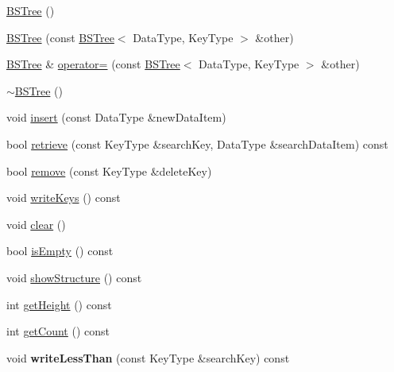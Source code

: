 \begin{DoxyCompactItemize}
\item 
\hyperlink{class_b_s_tree_a4513fc6697f5e51bff8e7c448b446c9e}{B\+S\+Tree} ()
\item 
\hyperlink{class_b_s_tree_a6658391c178cb35858c9c465e1839fb0}{B\+S\+Tree} (const \hyperlink{class_b_s_tree}{B\+S\+Tree}$<$ Data\+Type, Key\+Type $>$ \&other)
\item 
\hyperlink{class_b_s_tree}{B\+S\+Tree} \& \hyperlink{class_b_s_tree_ac36b0b564aa3c411c239d730f506f448}{operator=} (const \hyperlink{class_b_s_tree}{B\+S\+Tree}$<$ Data\+Type, Key\+Type $>$ \&other)
\item 
\hyperlink{class_b_s_tree_a968c51c539f4ae41357c78b6a60fea4c}{$\sim$\+B\+S\+Tree} ()
\item 
void \hyperlink{class_b_s_tree_ab86b4cea496ee53076021126423d51fd}{insert} (const Data\+Type \&new\+Data\+Item)
\item 
bool \hyperlink{class_b_s_tree_a4359bfee390669b5adaf0380ef62b18d}{retrieve} (const Key\+Type \&search\+Key, Data\+Type \&search\+Data\+Item) const 
\item 
bool \hyperlink{class_b_s_tree_a755549f7b88d0178a96ca84afd5e04cf}{remove} (const Key\+Type \&delete\+Key)
\item 
void \hyperlink{class_b_s_tree_a7f08f48e6d1bbe3eb726856a947325e7}{write\+Keys} () const 
\item 
void \hyperlink{class_b_s_tree_a926822d08f3d0321603f9fafd2254b16}{clear} ()
\item 
bool \hyperlink{class_b_s_tree_a43768375369ca8fe641a86451997ad45}{is\+Empty} () const 
\item 
void \hyperlink{class_b_s_tree_ac28277cacbf8ab33326473a419abf097}{show\+Structure} () const 
\item 
int \hyperlink{class_b_s_tree_a3850adc6b8ae965ec11ec0e0567b6f7d}{get\+Height} () const 
\item 
int \hyperlink{class_b_s_tree_a880d98553153533d3c29504e8a272c7d}{get\+Count} () const 
\item 
void {\bfseries write\+Less\+Than} (const Key\+Type \&search\+Key) const \hypertarget{class_b_s_tree_a92079e5301185f41eebe1c32c2357258}{}\label{class_b_s_tree_a92079e5301185f41eebe1c32c2357258}

\end{DoxyCompactItemize}
